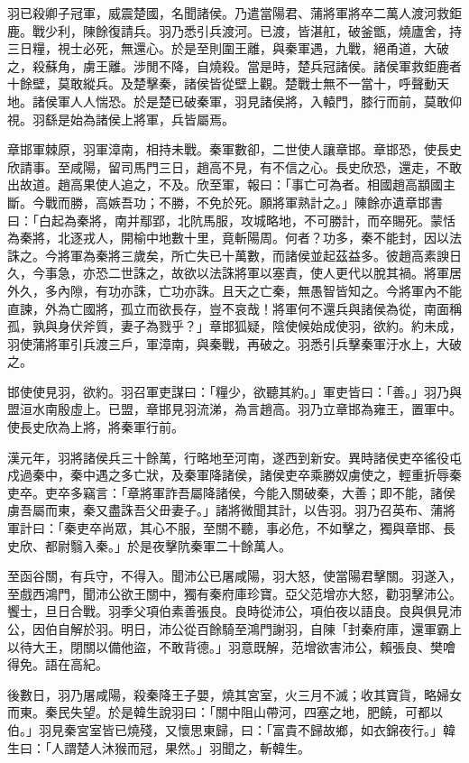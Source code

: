\begin{pinyinscope}
羽已殺卿子冠軍，威震楚國，名聞諸侯。乃遣當陽君、蒲將軍將卒二萬人渡河救鉅鹿。戰少利，陳餘復請兵。羽乃悉引兵渡河。已渡，皆湛舡，破釜甑，燒廬舍，持三日糧，視士必死，無還心。於是至則圍王離，與秦軍遇，九戰，絕甬道，大破之，殺蘇角，虜王離。涉閒不降，自燒殺。當是時，楚兵冠諸侯。諸侯軍救鉅鹿者十餘壁，莫敢縱兵。及楚擊秦，諸侯皆從壁上觀。楚戰士無不一當十，呼聲動天地。諸侯軍人人惴恐。於是楚已破秦軍，羽見諸侯將，入轅門，膝行而前，莫敢仰視。羽繇是始為諸侯上將軍，兵皆屬焉。

章邯軍棘原，羽軍漳南，相持未戰。秦軍數卻，二世使人讓章邯。章邯恐，使長史欣請事。至咸陽，留司馬門三日，趙高不見，有不信之心。長史欣恐，還走，不敢出故道。趙高果使人追之，不及。欣至軍，報曰：「事亡可為者。相國趙高顓國主斷。今戰而勝，高嫉吾功；不勝，不免於死。願將軍熟計之。」陳餘亦遺章邯書曰：「白起為秦將，南并鄢郢，北阬馬服，攻城略地，不可勝計，而卒賜死。蒙恬為秦將，北逐戎人，開榆中地數十里，竟斬陽周。何者？功多，秦不能封，因以法誅之。今將軍為秦將三歲矣，所亡失已十萬數，而諸侯並起茲益多。彼趙高素諛日久，今事急，亦恐二世誅之，故欲以法誅將軍以塞責，使人更代以脫其禍。將軍居外久，多內隙，有功亦誅，亡功亦誅。且天之亡秦，無愚智皆知之。今將軍內不能直諫，外為亡國將，孤立而欲長存，豈不哀哉！將軍何不還兵與諸侯為從，南面稱孤，孰與身伏斧質，妻子為戮乎？」章邯狐疑，陰使候始成使羽，欲約。約未成，羽使蒲將軍引兵渡三戶，軍漳南，與秦戰，再破之。羽悉引兵擊秦軍汙水上，大破之。

邯使使見羽，欲約。羽召軍吏謀曰：「糧少，欲聽其約。」軍吏皆曰：「善。」羽乃與盟洹水南殷虛上。已盟，章邯見羽流涕，為言趙高。羽乃立章邯為雍王，置軍中。使長史欣為上將，將秦軍行前。

漢元年，羽將諸侯兵三十餘萬，行略地至河南，遂西到新安。異時諸侯吏卒徭役屯戍過秦中，秦中遇之多亡狀，及秦軍降諸侯，諸侯吏卒乘勝奴虜使之，輕重折辱秦吏卒。吏卒多竊言：「章將軍詐吾屬降諸侯，今能入關破秦，大善；即不能，諸侯虜吾屬而東，秦又盡誅吾父毌妻子。」諸將微聞其計，以告羽。羽乃召英布、蒲將軍計曰：「秦吏卒尚眾，其心不服，至關不聽，事必危，不如擊之，獨與章邯、長史欣、都尉翳入秦。」於是夜擊阬秦軍二十餘萬人。

至函谷關，有兵守，不得入。聞沛公已屠咸陽，羽大怒，使當陽君擊關。羽遂入，至戲西鴻門，聞沛公欲王關中，獨有秦府庫珍寶。亞父范增亦大怒，勸羽擊沛公。饗士，旦日合戰。羽季父項伯素善張良。良時從沛公，項伯夜以語良。良與俱見沛公，因伯自解於羽。明日，沛公從百餘騎至鴻門謝羽，自陳「封秦府庫，還軍霸上以待大王，閉關以備他盜，不敢背德。」羽意既解，范增欲害沛公，賴張良、樊噲得免。語在高紀。

後數日，羽乃屠咸陽，殺秦降王子嬰，燒其宮室，火三月不滅；收其寶貨，略婦女而東。秦民失望。於是韓生說羽曰：「關中阻山帶河，四塞之地，肥饒，可都以伯。」羽見秦宮室皆已燒殘，又懷思東歸，曰：「富貴不歸故鄉，如衣錦夜行。」韓生曰：「人謂楚人沐猴而冠，果然。」羽聞之，斬韓生。


\end{pinyinscope}
